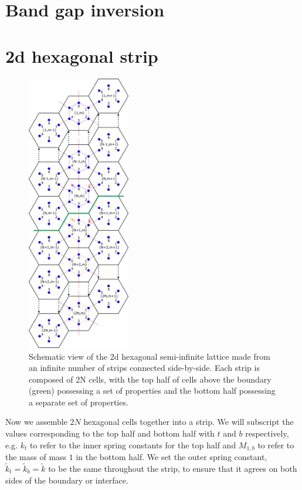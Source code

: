 \section{Band gap inversion}

\section{2d hexagonal strip}
\label{formstrip}

\begin{figure}[!h]
\centering
\includegraphics[width=0.4\textwidth]{imgs/hexstripmodel.png}
\caption{\label{fig:hexstripmodel} Schematic view of the 2d hexagonal
  semi-infinite lattice made from an infinite number of strips connected
  side-by-side. Each strip is composed of 2N cells, with the top half of cells
  above the boundary (green) possessing a set of properties and the bottom half
  possessing a separate set of properties.}
\end{figure}

Now we assemble $2N$ hexagonal cells together into a strip. We will subscript
the values corresponding to the top half and bottom half with $t$ and $b$
respectively, e.g. $k_t$ to refer to the inner spring constants for the top
half and $M_{1,b}$ to refer to the mass of mass $1$ in the bottom half. We set
the outer spring constant, $\tilde{k}_t=\tilde{k}_b=\tilde{k}$ to be the same
throughout the strip, to ensure that it agrees on both sides of the boundary or
interface.

